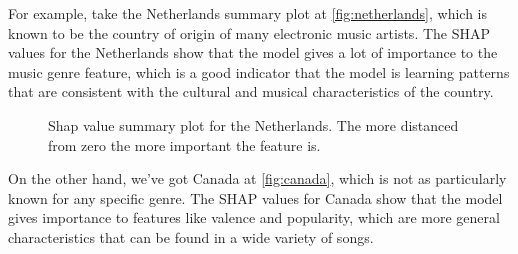 \documentclass{article}
\begin{document}
For example, take the Netherlands summary plot at \autoref{fig:netherlands}, which is known to be the country of origin of many electronic music artists. The SHAP values for the Netherlands show that the model gives a lot of importance to the music genre feature, which is a good indicator that the model is learning patterns that are consistent with the cultural and musical characteristics of the country.\newline

\begin{figure}[H]
    \centering
    \noindent
    \caption{Shap value summary plot for the Netherlands. The more distanced from zero the more important the feature is.}
    \label{fig:netherlands}
\end{figure}

On the other hand, we've got Canada at \autoref{fig:canada}, which is not as particularly known for any specific genre. The SHAP values for Canada show that the model gives importance to features like valence and popularity, which are more general characteristics that can be found in a wide variety of songs.
\end{document}
